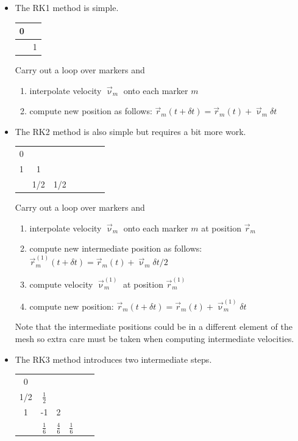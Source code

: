 \begin{itemize}
\item The RK1 method is simple.

\begin{tabular}{c|c}
0 & \\
\hline
 & 1
\end{tabular}

\noindent Carry out a loop over markers and 
\begin{enumerate}
\item interpolate velocity $\vec\upnu_{m}$ onto each marker $m$
\item compute new position as follows: $\vec r_m(t+\delta t)=\vec r_m(t) + \vec\upnu_m \delta t$
\end{enumerate}

\item The RK2 method is also simple but requires a bit more work.

\begin{tabular}{c|cccccc}
0 & \\
1 & 1 \\
\hline
 & 1/2 & 1/2 
\end{tabular}

\noindent Carry out a loop over markers and 
\begin{enumerate}
\item interpolate velocity $\vec\upnu_{m}$ onto each marker $m$ at position $\vec r_m$
\item compute new intermediate position as follows: $\vec r_m^{(1)}(t+\delta t)=\vec r_m(t) + \vec\upnu_m \delta t/2$
\item compute velocity $\vec\upnu_{m}^{(1)}$ at position $\vec r_m^{(1)}$
\item compute new position: $\vec r_m(t+\delta t)=\vec r_m(t) + \vec\upnu_m^{(1)} \delta t$ 
\end{enumerate}
Note that the intermediate positions could be in a different element of the mesh so extra 
care must be taken when computing intermediate velocities. 

\item 
The RK3 method introduces two intermediate steps. 

\begin{tabular}{c|ccccc}
0 & \\
1/2 & {\color{chestnut} $\frac{1}{2}$ } \\
1 & {\color{violet}-1} & {\color{violet}2} \\ 
\hline
 & {\color{carrotorange} $\frac16$} & {\color{carrotorange} $\frac46$}  & {\color{carrotorange} $\frac16$}
\end{tabular}


\end{itemize}
